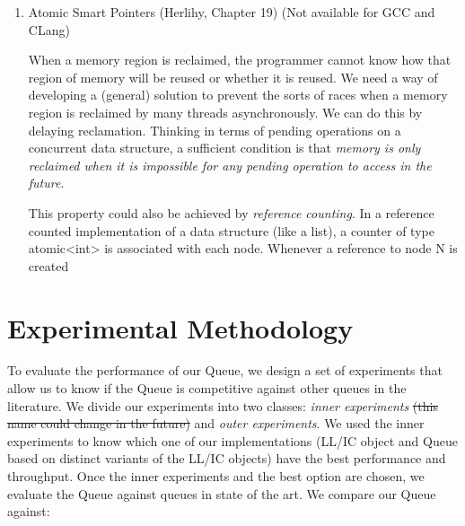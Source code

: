 \begin{enumerate}
\begin{lstlisting}[language=c++,label= ,caption= ,captionpos=b,numbers=none]
void func() {
    std::atomic<void*>& hp = get_hazard_pointer_for_current_thread();
    void* old_data = data.load();
    do {
        void* temp;
        do{ // Loop until you've set the hazard pointer
            temp = old_data;
            hp.store(old_data);
            old_data = data.load();
        } while (old_data != temp);
          }while (old_data &&
            !data.compare_exchange_strong(old_data, old_data->next);
    // Do something with old_data
    hp.store(nullptr); // clearing usage of hazard pointer
    // Trying clearing
    if (outstanding_hazard_pointers_for(old_head))
    {
        reclaim_later(old_data);
    }
    else
    {
        delete old_data;
    }
    delete_nodes_with_no_hazards();
}
\end{lstlisting}


\item Atomic Smart Pointers (Herlihy, Chapter 19) (Not available for GCC and CLang)
\label{sec:org58c7cdb}


When a memory region is reclaimed, the programmer cannot know how that
region of memory will be reused or whether it is reused. We need a
way of developing a (general) solution to prevent the sorts of races
when a memory region is reclaimed by many threads asynchronously. We can
do this by delaying reclamation.
Thinking in terms of pending operations on a concurrent data structure, a
sufficient condition is that \emph{memory is only reclaimed when it is impossible
for any pending operation to access in the future}.

This property could also be achieved by \emph{reference counting}. In a reference
counted implementation of a data structure (like a list), a counter of type
atomic<int> is associated with each node. Whenever a reference to node N is
created
\end{enumerate}

\section{\label{sec:methodology}Experimental Methodology}

\label{sec:orgebd0619}

To evaluate the performance of our Queue, we design a set of experiments that
allow us to know if the Queue is competitive against other queues in the
literature. We divide our experiments into two classes: \emph{inner experiments}
\sout{(this name could change in the future)} and \emph{outer experiments}. We used the
inner experiments to know which one of our implementations (LL/IC object and
Queue based on distinct variants of the LL/IC objects) have the best
performance and throughput. Once the inner experiments and the best
option are chosen, we evaluate the Queue against queues in state of the
art. We compare our Queue against:

